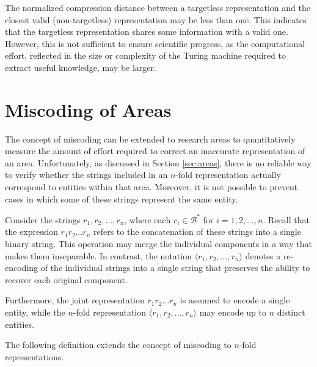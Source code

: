 The normalized compression distance between a targetless representation and the closest valid (non-targetless) representation may be less than one. This indicates that the targetless representation shares some information with a valid one. However, this is not sufficient to ensure scientific progress, as the computational effort, reflected in the size or complexity of the Turing machine required to extract useful knowledge, may be larger.

%
%
\section{Miscoding of Areas}
\label{sec:miscoding_areas}

The concept of miscoding can be extended to research areas to quantitatively measure the amount of effort required to correct an inaccurate representation of an area. Unfortunately, as discussed in Section \ref{sec:areas}, there is no reliable way to verify whether the strings included in an $n$-fold representation actually correspond to entities within that area. Moreover, it is not possible to prevent cases in which some of these strings represent the same entity.

Consider the strings $r_1, r_2, \ldots, r_n$, where each $r_i \in \mathcal{B}^\ast$ for $i = 1, 2, \ldots, n$. Recall that the expression $r_1 r_2 \ldots r_n$ refers to the concatenation of these strings into a single binary string. This operation may merge the individual components in a way that makes them inseparable. In contrast, the notation $\langle r_1, r_2, \ldots, r_n \rangle$ denotes a re-encoding of the individual strings into a single string that preserves the ability to recover each original component.

Furthermore, the joint representation $r_1 r_2 \ldots r_n$ is assumed to encode a single entity, while the $n$-fold representation $\langle r_1, r_2, \ldots, r_n \rangle$ may encode up to $n$ distinct entities.

The following definition extends the concept of miscoding to $n$-fold representations.

